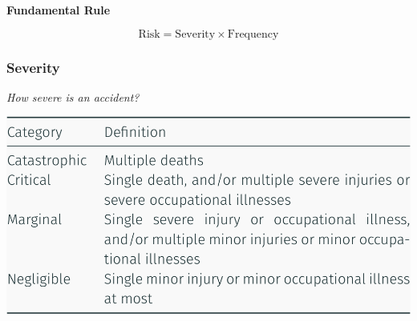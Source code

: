 \documentclass[
  10pt,
  a4paper,
  twocolumn]{article}
\begin{document}
\begin{tcolorbox}[enhanced jigsaw, toprule=.15mm, left=2mm, arc=.35mm, opacityback=0, rightrule=.15mm, breakable, bottomrule=.15mm, colframe=quarto-callout-important-color-frame, leftrule=.75mm, colback=white]
\begin{minipage}[t]{5.5mm}
\textcolor{quarto-callout-important-color}{\faExclamation}
\end{minipage}%
\begin{minipage}[t]{\textwidth - 5.5mm}

\vspace{-3mm}\textbf{Fundamental Rule}\vspace{3mm}

\[
\text{Risk} = \text{Severity} \times \text{Frequency} 
\]

\end{minipage}%
\end{tcolorbox}

\resizebox{\columnwidth}{!}{
  
}

\begin{minipage}[c][1cm][c]{.7\columnwidth}

\subsubsection{Severity}\label{severity}

\vspace{-2mm}{\color{Orchid}\faQuestionCircle[regular]} \emph{How severe
is an accident?}

\end{minipage}%
\begin{minipage}[c][1cm][c]{.3\columnwidth}
\makebox[30mm][r]{
\resizebox{!}{0.9cm}{
  
}}
\end{minipage}

\includegraphics{images/safety/image-3.png}
\end{document}
